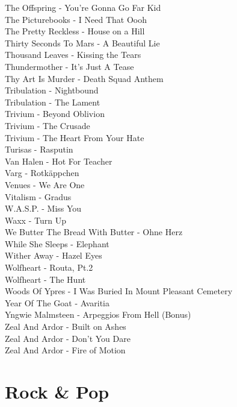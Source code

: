 The Offspring - You're Gonna Go Far Kid\\
The Picturebooks - I Need That Oooh\\
The Pretty Reckless - House on a Hill\\
Thirty Seconds To Mars - A Beautiful Lie\\
Thousand Leaves - Kissing the Tears\\
Thundermother - It's Just A Tease\\
Thy Art Is Murder - Death Squad Anthem\\
Tribulation - Nightbound\\
Tribulation - The Lament\\
Trivium - Beyond Oblivion\\
Trivium - The Crusade\\
Trivium - The Heart From Your Hate\\
Turisas - Rasputin\\
Van Halen - Hot For Teacher\\
Varg - Rotkäppchen\\
Venues - We Are One\\
Vitalism - Gradus\\
W.A.S.P. - Miss You\\
Waxx - Turn Up\\
We Butter The Bread With Butter - Ohne Herz\\
While She Sleeps - Elephant\\
Wither Away - Hazel Eyes\\
Wolfheart - Routa, Pt.2\\
Wolfheart - The Hunt\\
Woods Of Ypres - I Was Buried In Mount Pleasant Cemetery\\
Year Of The Goat - Avaritia\\
Yngwie Malmsteen - Arpeggios From Hell (Bonus)\\
Zeal And Ardor - Built on Ashes\\
Zeal And Ardor - Don't You Dare\\
Zeal And Ardor - Fire of Motion\\

\section{Rock \& Pop}

